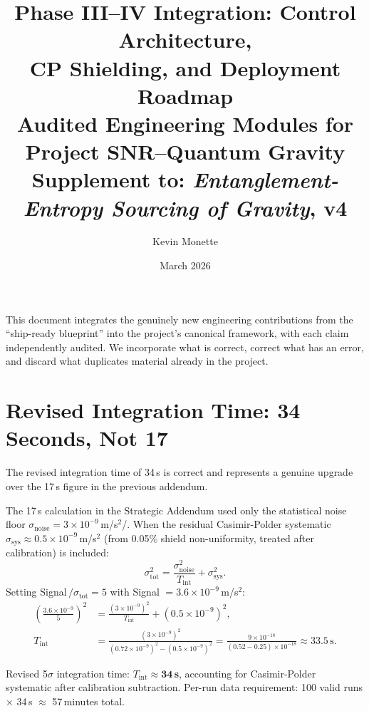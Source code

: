 \documentclass[11pt,letterpaper]{article}
\title{\textbf{Phase III--IV Integration: Control Architecture,\\
CP Shielding, and Deployment Roadmap}\\[4pt]
\large Audited Engineering Modules for Project SNR--Quantum Gravity\\[3pt]
\normalsize Supplement to: \textit{Entanglement-Entropy Sourcing of Gravity}, v4}
\author{Kevin Monette}
\date{March 2026}
\begin{document}
\maketitle

This document integrates the genuinely new engineering contributions from the
``ship-ready blueprint'' into the project's canonical framework, with each claim
independently audited.  We incorporate what is correct, correct what has an error,
and discard what duplicates material already in the project.

\section{Revised Integration Time: 34 Seconds, Not 17}

\begin{auditpass}
The revised integration time of 34\,s is correct and represents a genuine
upgrade over the 17\,s figure in the previous addendum.
\end{auditpass}

The 17\,s calculation in the Strategic Addendum used only the statistical noise floor
$\sigma_{\mathrm{noise}} = 3\times10^{-9}$\,m/s$^2$/\!.  When the residual
Casimir-Polder systematic $\sigma_{\mathrm{sys}} \approx 0.5\times10^{-9}$\,m/s$^2$
(from 0.05\% shield non-uniformity, treated after calibration) is included:
\begin{equation}
  \sigma_{\mathrm{tot}}^2 = \frac{\sigma_{\mathrm{noise}}^2}{T_{\mathrm{int}}}
  + \sigma_{\mathrm{sys}}^2.
\end{equation}
Setting Signal\,$/\sigma_{\mathrm{tot}} = 5$ with
Signal $= 3.6\times10^{-9}$\,m/s$^2$:
\begin{align}
  \left(\frac{3.6\times10^{-9}}{5}\right)^2
  &= \frac{(3\times10^{-9})^2}{T_{\mathrm{int}}} + (0.5\times10^{-9})^2, \\
  T_{\mathrm{int}}
  &= \frac{(3\times10^{-9})^2}{(0.72\times10^{-9})^2 - (0.5\times10^{-9})^2}
  = \frac{9\times10^{-18}}{(0.52-0.25)\times10^{-18}}
  \approx 33.5\,\text{s}.
\end{align}

\begin{keynum}
Revised 5$\sigma$ integration time: $T_{\mathrm{int}} \approx \mathbf{34}$\,\textbf{s},
accounting for Casimir-Polder systematic after calibration subtraction.
Per-run data requirement: 100 valid runs $\times$ 34\,s $\approx$ 57\,minutes total.
\end{keynum}
\end{document}
